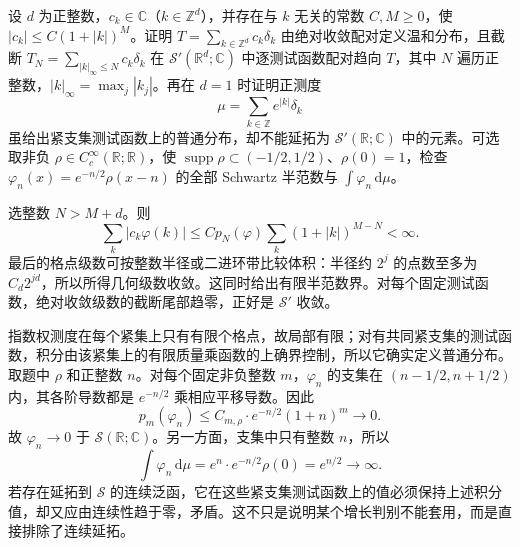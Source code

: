 \begin{exercise}\label{b2:ex:05-polynomial-comb}
设 \(d\) 为正整数，\(c_k\in\mathbb C\)（\(k\in\mathbb Z^d\)），并存在与 \(k\) 无关的常数 \(C,M\geq0\)，使 \(|c_k|\leq C(1+|k|)^M\)。证明 \(T=\sum_{k\in\mathbb Z^d}c_k\delta_k\) 由绝对收敛配对定义温和分布，且截断 \(T_N=\sum_{|k|_\infty\leq N}c_k\delta_k\) 在 \(\mathcal S'(\mathbb R^d;\mathbb C)\) 中逐测试函数配对趋向 \(T\)，其中 \(N\) 遍历正整数，\(|k|_\infty=\max_j|k_j|\)。再在 \(d=1\) 时证明正测度
\[
 \mu=\sum_{k\in\mathbb Z}e^{|k|}\delta_k
\]
虽给出紧支集测试函数上的普通分布，却不能延拓为 \(\mathcal S'(\mathbb R;\mathbb C)\) 中的元素。可选取非负 \(\rho\in C_c^\infty(\mathbb R;\mathbb R)\)，使 \(\operatorname{supp}\rho\subset(-1/2,1/2)\)、\(\rho(0)=1\)，检查 \(\varphi_n(x)=e^{-n/2}\rho(x-n)\) 的全部 Schwartz 半范数与 \(\int\varphi_n\,\mathrm d\mu\)。
\end{exercise}
\begin{solution}
选整数 \(N>M+d\)。则
\[
 \sum_k|c_k\varphi(k)|
 \leq C p_N(\varphi)\sum_k(1+|k|)^{M-N}<\infty.
\]
最后的格点级数可按整数半径或二进环带比较体积：半径约 \(2^j\) 的点数至多为 \(C_d2^{jd}\)，所以所得几何级数收敛。这同时给出有限半范数界。对每个固定测试函数，绝对收敛级数的截断尾部趋零，正好是 \(\mathcal S'\) 收敛。

指数权测度在每个紧集上只有有限个格点，故局部有限；对有共同紧支集的测试函数，积分由该紧集上的有限质量乘函数的上确界控制，所以它确实定义普通分布。取题中 \(\rho\) 和正整数 \(n\)。对每个固定非负整数 \(m\)，\(\varphi_n\) 的支集在 \((n-1/2,n+1/2)\) 内，其各阶导数都是 \(e^{-n/2}\) 乘相应平移导数。因此
\[
 p_m(\varphi_n)
 \leq C_{m,\rho}\cdot e^{-n/2}(1+n)^m\longrightarrow0.
\]
故 \(\varphi_n\to0\) 于 \(\mathcal S(\mathbb R;\mathbb C)\)。另一方面，支集中只有整数 \(n\)，所以
\[
 \int\varphi_n\,\mathrm d\mu
 =e^n\cdot e^{-n/2}\rho(0)=e^{n/2}\longrightarrow\infty.
\]
若存在延拓到 \(\mathcal S\) 的连续泛函，它在这些紧支集测试函数上的值必须保持上述积分值，却又应由连续性趋于零，矛盾。这不只是说明某个增长判别不能套用，而是直接排除了连续延拓。
\end{solution}

